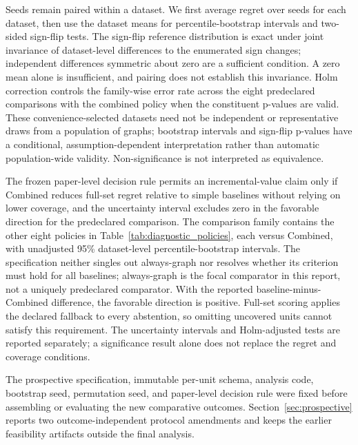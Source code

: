 Seeds remain paired within a dataset. We first average regret over seeds for each dataset, then use the dataset means for percentile-bootstrap intervals and two-sided sign-flip tests. The sign-flip reference distribution is exact under joint invariance of dataset-level differences to the enumerated sign changes; independent differences symmetric about zero are a sufficient condition. A zero mean alone is insufficient, and pairing does not establish this invariance. Holm correction controls the family-wise error rate across the eight predeclared comparisons with the combined policy when the constituent p-values are valid. These convenience-selected datasets need not be independent or representative draws from a population of graphs; bootstrap intervals and sign-flip p-values have a conditional, assumption-dependent interpretation rather than automatic population-wide validity. Non-significance is not interpreted as equivalence.

The frozen paper-level decision rule permits an incremental-value claim only if Combined reduces full-set regret relative to simple baselines without relying on lower coverage, and the uncertainty interval excludes zero in the favorable direction for the predeclared comparison. The comparison family contains the other eight policies in Table~\ref{tab:diagnostic_policies}, each versus Combined, with unadjusted 95\% dataset-level percentile-bootstrap intervals. The specification neither singles out always-graph nor resolves whether its criterion must hold for all baselines; always-graph is the focal comparator in this report, not a uniquely predeclared comparator. With the reported baseline-minus-Combined difference, the favorable direction is positive. Full-set scoring applies the declared fallback to every abstention, so omitting uncovered units cannot satisfy this requirement. The uncertainty intervals and Holm-adjusted tests are reported separately; a significance result alone does not replace the regret and coverage conditions.

The prospective specification, immutable per-unit schema, analysis code, bootstrap seed, permutation seed, and paper-level decision rule were fixed before assembling or evaluating the new comparative outcomes. Section~\ref{sec:prospective} reports two outcome-independent protocol amendments and keeps the earlier feasibility artifacts outside the final analysis.
